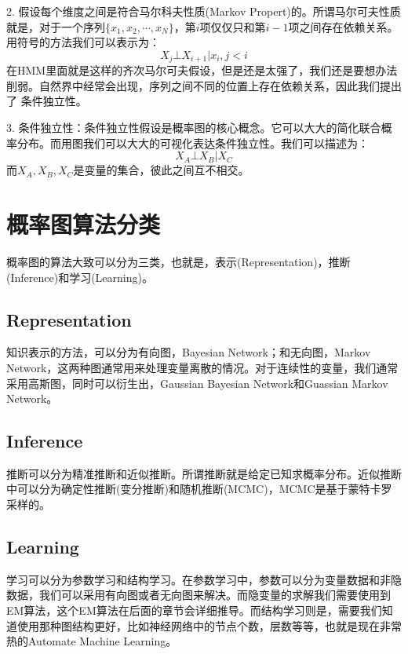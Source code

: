 \documentclass[a4paper]{article}
\begin{document}
2. 假设每个维度之间是符合马尔科夫性质(Markov Propert)的。所谓马尔可夫性质就是，对于一个序列$\{ x_1,x_2,\cdots,x_N \}$，第$i$项仅仅只和第$i-1$项之间存在依赖关系。用符号的方法我们可以表示为：
\begin{equation}
    X_j\bot X_{i+1}| x_i, j<i
\end{equation}
在HMM里面就是这样的齐次马尔可夫假设，但是还是太强了，我们还是要想办法削弱。自然界中经常会出现，序列之间不同的位置上存在依赖关系，因此我们提出了{\color{red} 条件独立性}。

3. 条件独立性：条件独立性假设是概率图的核心概念。它可以大大的简化联合概率分布。而用图我们可以大大的可视化表达条件独立性。我们可以描述为：
\begin{equation}
    X_A \bot X_B |X_C
\end{equation}
而$X_A,X_B,X_C$是变量的集合，彼此之间互不相交。

\section{概率图算法分类}
概率图的算法大致可以分为三类，也就是，表示(Representation)，推断(Inference)和学习(Learning)。
\subsection{Representation}
知识表示的方法，可以分为有向图，Bayesian Network；和无向图，Markov Network，这两种图通常用来处理变量离散的情况。对于连续性的变量，我们通常采用高斯图，同时可以衍生出，Gaussian Bayesian Network和Guassian Markov Network。

\subsection{Inference}
推断可以分为精准推断和近似推断。所谓推断就是给定已知求概率分布。近似推断中可以分为确定性推断(变分推断)和随机推断(MCMC)，MCMC是基于蒙特卡罗采样的。

\subsection{Learning}
学习可以分为参数学习和结构学习。在参数学习中，参数可以分为变量数据和非隐数据，我们可以采用有向图或者无向图来解决。而隐变量的求解我们需要使用到EM算法，这个EM算法在后面的章节会详细推导。而结构学习则是，需要我们知道使用那种图结构更好，比如神经网络中的节点个数，层数等等，也就是现在非常热的Automate Machine Learning。




















 
\end{document}
